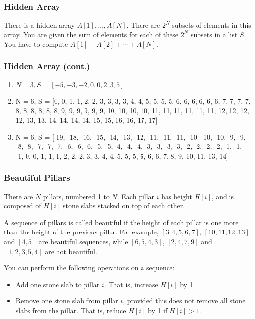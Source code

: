 \documentclass{beamer}
\begin{document}
\begin{frame}
\end{frame}

\begin{frame}[fragile]
\frametitle{Hidden Array}

There is a hidden array $A[1], \ldots, A[N]$. There are $2^N$ subsets of elements in this array. You are given the sum of elements for each of these $2^N$ subsets in a list $S$. You have to compute $A[1] + A[2] + \cdots + A[N]$.
\end{frame}

\begin{frame}
\frametitle{Hidden Array (cont.)}
\begin{enumerate}
\item[(a)] $N = 3, S = [-5, -3, -2, 0, 0, 2, 3, 5]$

\item[(b)] N = 6, S = [0, 0, 1, 1, 2, 2, 3, 3, 3, 3, 4, 4, 5, 5, 5, 5, 
    6, 6, 6, 6, 6, 6, 7, 7, 7, 7, 8, 8, 8, 8, 8, 8, 9, 9, 9, 9, 9,
    9, 10, 10, 10, 10, 11, 11, 11, 11, 11, 11, 12, 12, 12, 12, 13, 
    13, 14, 14, 14, 14, 15, 15, 16, 16, 17, 17]

\item[(c)] N = 6, S = [-19, -18, -16, -15, -14, -13, -12, -11, -11, -11, -10, -10, -10, -9, -9, -8, -8, -7, -7, -7, -6, -6, -6, -5, -5, -4, -4, -4, -3, -3, -3, -3, -2, -2, -2, -2, -1, -1, -1, 0, 0, 1, 1, 1, 2, 2, 2, 3, 3, 4, 4, 5, 5, 5, 6, 6, 6, 7, 8, 9, 10, 11, 13, 14]
\end{enumerate}
\end{frame}

\begin{frame}
\end{frame}

\begin{frame}[fragile]
\frametitle{Beautiful Pillars}

There are $N$ pillars, numbered 1 to $N$. Each pillar $i$ has height $H[i]$, and is composed of $H[i]$ stone slabs stacked on top of each other.

A sequence of pillars is called beautiful if the height of each pillar is one more than the height of the previous pillar. For example, $[3, 4, 5, 6, 7]$, $[10, 11, 12, 13]$ and $[4, 5]$ are beautiful sequences, while $[6, 5, 4, 3]$, $[2, 4, 7, 9]$ and $[1, 2, 3, 5, 4]$ are not beautiful.

You can perform the following operations on a sequence:
\begin{itemize}
\item Add one stone slab to pillar $i$. That is, increase $H[i]$ by 1.
\item Remove one stone slab from pillar $i$, provided this does not remove all stone slabs from the pillar. That is, reduce $H[i]$ by 1 if $H[i] > 1$.
\end{itemize}
\end{frame}
\end{document}
